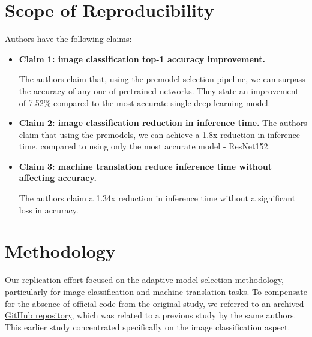 \section{Scope of Reproducibility}
Authors have the following claims:
\begin{itemize}
	\item \textbf{Claim 1: image classification top-1 accuracy improvement.}
	      
	      The authors claim that, using the premodel selection pipeline, we can surpass the accuracy of any one of pretrained networks. They state an improvement of 7.52\% compared to the most-accurate single deep learning model.
	      
	\item \textbf{Claim 2: image classification reduction in inference time.}
       The authors claim that using the premodels, we can achieve a 1.8x reduction in inference time, compared to using only the most accurate model - ResNet152.
	      
	\item \textbf{Claim 3: machine translation reduce inference time without affecting accuracy.}
	      
	      The authors claim a 1.34x reduction in inference time without a significant loss in accuracy.
	      
\end{itemize}


\section{Methodology}

Our replication effort focused on the adaptive model selection methodology, particularly for image classification and machine translation tasks. To compensate for the absence of official code from the original study, we referred to an \href{https://github.com/qwerybot/Adaptive_Deep_Learning}{archived GitHub repository}, which was related to a previous study\supercite{taylor2018adaptive} by the same authors. This earlier study concentrated specifically on the image classification aspect.

